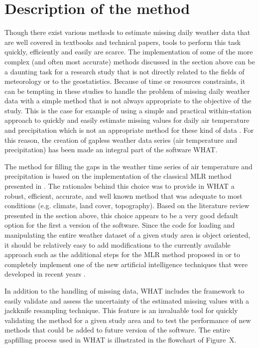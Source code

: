 \documentclass[WHATMANUAL.tex]{subfiles}
\begin{document}
\section{Description of the method}

Though there exist various methods to estimate missing daily weather data that are well covered in textbooks and technical papers, tools to perform this task quickly, efficiently and easily are scarce. The implementation of some of the more complex (and often most accurate) methods discussed in the section above can be a daunting task for a research study that is not directly related to the fields of meteorology or to the geostatistics. Because of time or resources constraints, it can be tempting in these studies to handle the problem of missing daily weather data with a simple method that is not always appropriate to the objective of the study. This is the case for example of using a simple and practical within-station approach to quickly and easily estimate missing values for daily air temperature and precipitation which is not an appropriate method for these kind of data \citep{eischeid_quality_1995,simolo_improving_2010,kemp_estimating_1983}. For this reason, the creation of gapless weather data series (air temperature and precipitation) has been made an integral part of the software WHAT.

The method for filling the gaps in the weather time series of air temperature and precipitation is based on the implementation of the classical MLR method presented in \cite{eischeid_creating_2000}. The rationales behind this choice was to provide in WHAT a robust, efficient, accurate, and well known method that was adequate to most conditions (e.g. climate, land cover, topography). Based on the literature review presented in the section above, this choice appears to be a very good default option for the first a version of the software. Since the code for loading and manipulating the entire weather dataset of a given study area is object oriented, it should be relatively easy to add modifications to the currently available approach such as the additional steps for the MLR method proposed in \cite{simolo_improving_2010} or to completely implement one of the new artificial intelligence techniques that were developed in recent years \citep{kashani_evaluation_2011}.

In addition to the handling of missing data, WHAT includes the framework to easily validate and assess the uncertainty of the estimated missing values with a jackknife resampling technique. This feature is an invaluable tool for quickly validating the method for a given study area and to test the performance of new methods that could be added to future version of the software. The entire gapfilling process used in WHAT is illustrated in the flowchart of Figure~X.
\end{document}
